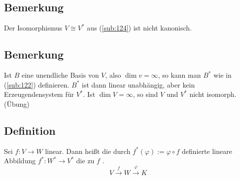 \subsection[Bemerkung: Dieser Isomorphismus ist nicht kanonisch]{Bemerkung} %
\label{sub:125}
Der Isomorphismus $V \cong V^*$ aus (\ref{sub:124}) ist nicht kanonisch.

\subsection[Bermerkung zur vermeintlichen Basis $B^*$ von $V^*$ im unendlichdimensionalen Fall]{Bemerkung} %
\label{sub:126}
Ist $B$ eine unendliche Basis von $V$, also $\dim v = \infty$, so kann man $B^*$ wie in (\ref{sub:122}) definieren. $B^*$ ist dann linear unabhängig, aber kein 
Erzeugendensystem für $V^*$. Ist $\dim V = \infty$, so sind $V$ und $V^*$ nicht isomorph. \hfill (Übung)

\subsection[Definition: Duale Abbildung]{Definition} %
\label{sub:127}
Sei $f : V \to W$ linear. Dann heißt die durch $f^* (\varphi) := \varphi \circ f$ definierte lineare Abbildung $f^* : W^*  \to V^*$ die zu $f$ . 
\[
	V \xrightarrow{f} W \xrightarrow{\varphi } K  
\]

